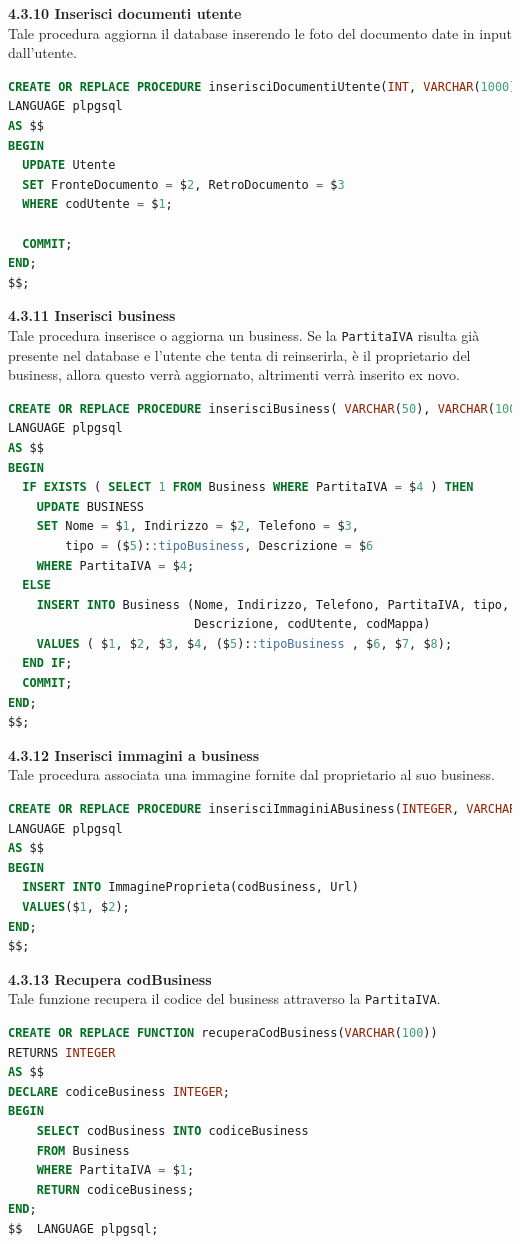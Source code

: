 \documentclass[a4paper,12pt]{article}
\begin{document}
\newpage\null{}\setcounter{page}{20}
\vspace{-2cm}
{\flushleft \bf 4.3.10  Inserisci documenti utente}\\
Tale procedura aggiorna il database inserendo le foto del documento date in input dall'utente.
\begin{lstlisting}[language=SQL]
CREATE OR REPLACE PROCEDURE inserisciDocumentiUtente(INT, VARCHAR(1000), VARCHAR(1000))
LANGUAGE plpgsql
AS $$
BEGIN
  UPDATE Utente
  SET FronteDocumento = $2, RetroDocumento = $3
  WHERE codUtente = $1;

  COMMIT;
END;
$$;
\end{lstlisting}

\vspace*{+1cm}

{\flushleft \bf 4.3.11  Inserisci business}\\
Tale procedura inserisce o aggiorna un business. Se la \verb|PartitaIVA| risulta già presente nel database e l'utente che tenta di reinserirla, è il proprietario del business, allora questo verrà aggiornato, altrimenti verrà inserito ex novo.
\begin{lstlisting}[language=SQL]
CREATE OR REPLACE PROCEDURE inserisciBusiness( VARCHAR(50), VARCHAR(100), VARCHAR(10), VARCHAR(100), VARCHAR(100), VARCHAR(2000), INTEGER, INTEGER)
LANGUAGE plpgsql
AS $$
BEGIN
  IF EXISTS ( SELECT 1 FROM Business WHERE PartitaIVA = $4 ) THEN
	UPDATE BUSINESS
	SET Nome = $1, Indirizzo = $2, Telefono = $3, 
	    tipo = ($5)::tipoBusiness, Descrizione = $6 
	WHERE PartitaIVA = $4;
  ELSE
	INSERT INTO Business (Nome, Indirizzo, Telefono, PartitaIVA, tipo, 
	                      Descrizione, codUtente, codMappa)
	VALUES ( $1, $2, $3, $4, ($5)::tipoBusiness , $6, $7, $8);
  END IF;
  COMMIT;
END;
$$;
\end{lstlisting}

\vspace*{+1cm}

{\flushleft \bf 4.3.12  Inserisci immagini a business}\\
Tale procedura associata una immagine fornite dal proprietario al suo business.
\begin{lstlisting}[language=SQL]
CREATE OR REPLACE PROCEDURE inserisciImmaginiABusiness(INTEGER, VARCHAR(1000))
LANGUAGE plpgsql
AS $$
BEGIN
  INSERT INTO ImmagineProprieta(codBusiness, Url)
  VALUES($1, $2);
END;
$$;
\end{lstlisting}
\newpage

\newpage\null{}\setcounter{page}{21}
\vspace{-2cm}
{\flushleft \bf 4.3.13  Recupera codBusiness}\\
Tale funzione recupera il codice del business attraverso la \verb|PartitaIVA|.
\begin{lstlisting}[language=SQL]
CREATE OR REPLACE FUNCTION recuperaCodBusiness(VARCHAR(100))
RETURNS INTEGER
AS $$
DECLARE codiceBusiness INTEGER;
BEGIN
	SELECT codBusiness INTO codiceBusiness
	FROM Business
	WHERE PartitaIVA = $1;
	RETURN codiceBusiness;
END;
$$  LANGUAGE plpgsql;
\end{lstlisting}
\end{document}
